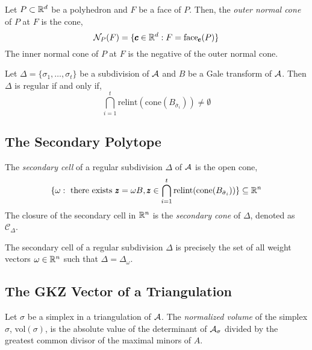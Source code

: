 \begin{definition}
    Let $P \subset \mathbb{R}^d$ be a polyhedron and $F$ be a face of $P$.
    Then, the \textit{outer normal cone} of $P$ at $F$ is the cone,
    $$\mathcal{N}_P(F) = \{ \pmb{c} \in \mathbb{R}^d : F = \text{face}_{\pmb{c}}(P)\}$$
    The inner normal cone of $P$ at $F$ is the negative of the outer normal cone.
\end{definition}

\begin{theorem}[Lee91]
    Let $\Delta = \{\sigma_1, \dots, \sigma_t \}$ be a subdivision of $\mathcal{A}$ and $B$ be a Gale transform of $\mathcal{A}$.
    Then $\Delta$ is regular if and only if,
    $$\bigcap_{i=1}^t \text{relint}(\text{cone}(B_{\bar{\sigma}_i})) \neq \emptyset$$
\end{theorem}

\subsection{The Secondary Polytope}

\begin{definition}
    The \textit{secondary cell} of a regular subdivision $\Delta$ of $\mathcal{A}$ is the open cone,
    $$\{ \omega : \text{ there exists } \pmb{z} = \omega B, \pmb{z} \in \bigcap_{i = 1}^t \text{relint}(\text{cone}(B_{\bar{\sigma}_i})) \} \subseteq \mathbb{R}^n$$
    The closure of the secondary cell in $\mathbb{R}^n$ is the \textit{secondary cone} of $\Delta$, denoted as $\mathcal{C}_{\Delta}$.
\end{definition}

\begin{theorem}
    The secondary cell of a regular subdivision $\Delta$ is precisely the set of all weight vectors $\omega \in \mathbb{R}^n$ such that $\Delta = \Delta_{\omega}$.
\end{theorem}

\subsection{The GKZ Vector of a Triangulation}

\begin{definition}
    Let $\sigma$ be a simplex in a triangulation of $\mathcal{A}$.
    The \textit{normalized volume} of the simplex $\sigma$, vol$(\sigma)$, is the absolute value of the determinant of $\mathcal{A}_{\sigma}$ divided by the greatest common divisor of the maximal minors of $A$.
\end{definition}

